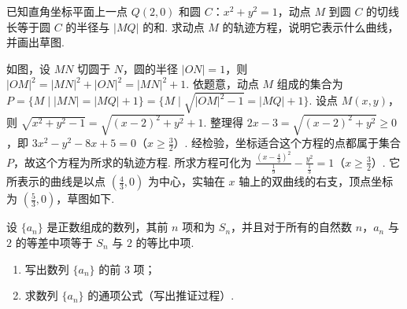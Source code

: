 \documentclass[UTF8,a4paper,oneside,11pt]{ctexbook}
\begin{document}
\begin{problem}
已知直角坐标平面上一点 \(Q(2, 0)\) 和圆 \(C\)：\(x^2 + y^2 = 1\)，动点 \(M\) 到圆 \(C\) 的切线长等于圆 \(C\) 的半径与 \(|MQ|\) 的和. 求动点 \(M\) 的轨迹方程，说明它表示什么曲线，并画出草图.

\end{problem}

\begin{solution}
如图，设 \(MN\) 切圆于 \(N\)，圆的半径 \(|ON| = 1\)，则 \(|OM|^2 = |MN|^2 + |ON|^2 = |MN|^2 + 1\). 依题意，动点 \(M\) 组成的集合为 \(P = \{M \mid |MN| = |MQ| + 1\} = \{M \mid \sqrt{|OM|^2 - 1} = |MQ| + 1\}\). 设点 \(M(x, y)\)，则 \(\sqrt{x^2 + y^2 - 1} = \sqrt{(x - 2)^2 + y^2} + 1\). 整理得 \(2x - 3 = \sqrt{(x - 2)^2 + y^2} \geqslant 0\)，即 \(3x^2 - y^2 - 8x + 5 = 0\)（\(x \geqslant \frac{3}{2}\)）. 经检验，坐标适合这个方程的点都属于集合 \(P\)，故这个方程为所求的轨迹方程. 所求方程可化为 \(\frac{\left(x - \frac{4}{3}\right)^2}{\frac{1}{9}} - \frac{y^2}{\frac{1}{3}} = 1\)（\(x \geqslant \frac{3}{2}\)）. 它所表示的曲线是以点 \(\left(\frac{4}{3}, 0\right)\) 为中心，实轴在 \(x\) 轴上的双曲线的右支，顶点坐标为 \(\left(\frac{5}{3}, 0\right)\)，草图如下.
\end{solution}

\begin{problem}
设 \(\{a_n\}\) 是正数组成的数列，其前 \(n\) 项和为 \(S_n\)，并且对于所有的自然数 \(n\)，\(a_n\) 与 \(2\) 的等差中项等于 \(S_n\) 与 \(2\) 的等比中项.

\begin{enumerate}
\item 写出数列 \(\{a_n\}\) 的前 \(3\) 项；
\item 求数列 \(\{a_n\}\) 的通项公式（写出推证过程）.
\end{enumerate}
\end{problem}
\end{document}

